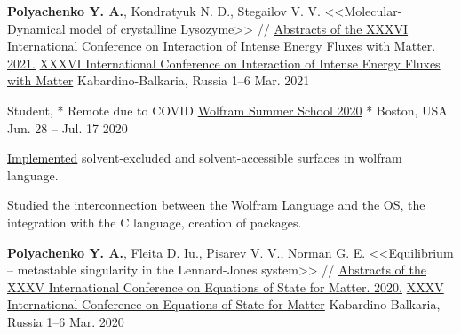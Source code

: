 

    

\begin{cventries}

  \cventry
    {\textbf{Polyachenko Y. A.}, Kondratyuk N. D., Stegailov V. V. <<Molecular-Dynamical model of crystalline Lysozyme>> // \href{http://www.ihed.ras.ru/elbrus21/program/restore.php?id=154}{Abstracts of the XXXVI International Conference on Interaction of Intense Energy Fluxes with Matter. 2021.}} %
    {\href{http://www.ihed.ras.ru/elbrus21/}{XXXVI International Conference on Interaction of Intense Energy Fluxes with Matter}} %
    {Kabardino-Balkaria, Russia} %
    {1--6 Mar. 2021} %
    {}

  \cventry
    {Student, * Remote due to COVID} %
    {\href{https://education.wolfram.com/summer/school/}{Wolfram Summer School 2020}} %
    {* Boston, USA} %
    {Jun. 28 -- Jul. 17 2020} %
    {
      \begin{cvitems} %
        \item {\href{https://community.wolfram.com/groups/-/m/t/2029621}{Implemented} solvent-excluded and solvent-accessible surfaces in wolfram language.}      
        \item {Studied the interconnection between the Wolfram Language and the OS, the integration with the C language, creation of packages.}
      \end{cvitems}
    }


  \cventry
    {\textbf{Polyachenko Y. A.}, Fleita D. Iu., Pisarev V. V., Norman G. E. <<Equilibrium – metastable singularity in the Lennard-Jones system>> // \href{http://www.ihed.ras.ru/elbrus20/program/restore.php?id=78}{Abstracts of the XXXV International Conference on Equations of State for Matter. 2020.}} %
    {\href{http://www.ihed.ras.ru/elbrus20/}{XXXV International Conference on Equations of State for Matter}} %
    {Kabardino-Balkaria, Russia} %
    {1--6 Mar. 2020} %
    {}


\end{cventries}
